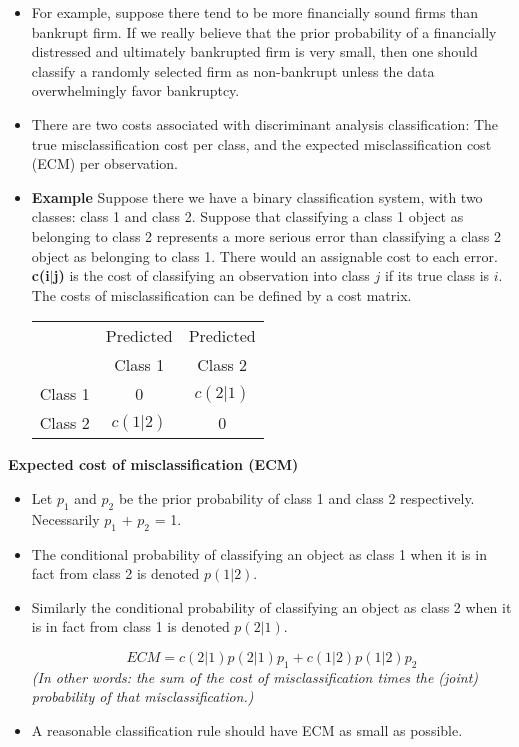 \documentclass[]{report}
\begin{document}
\begin{itemize}
	\item 	For example, suppose there tend to be more financially sound firms than bankrupt
	firm. If we really believe that the prior probability of a financially
	distressed and ultimately bankrupted firm is very small, then one should
	classify a randomly selected firm as non-bankrupt unless the data
	overwhelmingly favor bankruptcy.
	
	
	
	\item 	There are two costs associated with discriminant analysis classification: The true misclassification cost per class, and the expected misclassification cost (ECM) per observation.
	
	\item 	\textbf{Example} Suppose there we have a binary classification system, with two classes: class 1 and class 2.
	Suppose that classifying a class 1 object as belonging to class 2 represents a more serious error than classifying a class 2 object as belonging to class 1. There would an assignable cost to each error.
	\textbf{c(i$|$j)} is the cost of classifying an observation into class $j$ if its true class is $i$.
	The costs of misclassification can be defined by a cost matrix.
	
	\begin{center}
	\begin{tabular}{|c|c|c|}
		\hline
		& Predicted & Predicted \\
		& Class 1 & Class 2 \\  \hline
		Class 1 & 0 & $c(2|1)$  \\ \hline
		Class 2 & $c(1|2)$ & 0 \\
		\hline
	\end{tabular}
	\end{center}
	
\end{itemize}

\noindent \textbf{Expected cost of misclassification (ECM)}
\begin{itemize}
	\item Let $p_1$ and $p_2$ be the prior probability of class 1 and class 2 respectively.
	Necessarily $p_1$ + $p_2$ = 1.
	
\item	The conditional probability of classifying an object as class 1 when it is in fact from
	class 2 is denoted $p(1|2)$.
\item 	Similarly the conditional probability of classifying an object as class 2 when it is in
	fact from class 1 is denoted $p(2|1)$.
	
	\[ECM = c(2|1)p(2|1)p_1 + c(1|2)p(1|2)p_2\]
\textit{(In other words: the sum of the cost of misclassification times the (joint) probability of that misclassification.)}
	
\item 	A reasonable classification rule should have ECM as small as possible.
\end{itemize}
\end{document}
